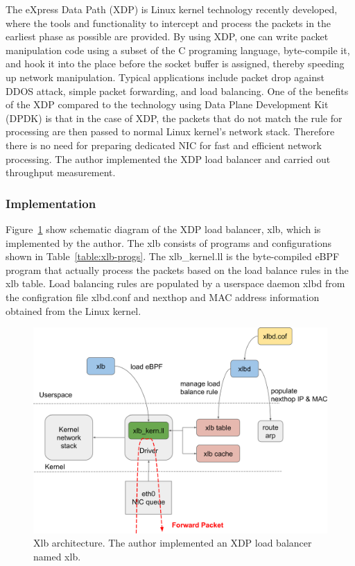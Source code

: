 The eXpress Data Path (XDP) \cite{hoiland2018express} is Linux kernel technology recently developed, where the tools and functionality to intercept and process the packets in the earliest phase as possible are provided.
By using XDP, one can write packet manipulation code using a subset of the C programing language, byte-compile it, and hook it into the place before the socket buffer is assigned, thereby speeding up network manipulation.
Typical applications include packet drop against DDOS attack, simple packet forwarding, and load balancing.
One of the benefits of the XDP compared to the technology using Data Plane Development Kit (DPDK) \cite{dpdkorg} is that in the case of XDP, the packets that do not match the rule for processing are then passed to normal Linux kernel's network stack.
Therefore there is no need for preparing dedicated NIC for fast and efficient network processing.
The author implemented the XDP load balancer and carried out throughput measurement.

\subsubsection{Implementation}

Figure~\ref{fig:xlb-schem} show schematic diagram of the XDP load balancer, xlb, which is implemented by the author.
The xlb consists of programs and configurations shown in Table~\ref{table:xlb-progs}.
The xlb\_kernel.ll is the byte-compiled eBPF program that actually process the packets based on the load balance rules in the xlb table.
Load balancing rules are populated by a userspace daemon xlbd from the configration file xlbd.conf and nexthop and MAC address information obtained from the Linux kernel.

\begin{figure}[h]
  \centering
  \includegraphics[width=0.9\columnwidth]{Figs/xlb-schem}

  \par\bigskip
  \centering
  \begin{minipage}{0.9\columnwidth}
    \caption[Xlb architecture]{
      Xlb architecture.
      The author implemented an XDP load balancer named xlb.
    }
    \label{fig:xlb-schem}
  \end{minipage}
\end{figure}

